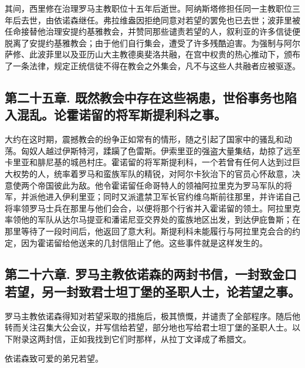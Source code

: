 其间，西里修在治理罗马主教职位十五年后逝世。阿纳斯塔修担任同一主教职位三年后去世，由依诺森继任。弗拉维盎因拒绝同意对若望的罢免也已去世；波菲里被任命接替他治理安提约基雅教会，并赞同那些谴责若望的人，叙利亚的许多信徒便脱离了安提约基雅教会；由于他们自行集会，遭受了许多残酷迫害。为强制与阿尔萨修、此波菲里以及亚历山大主教德奥斐洛共融，在宫中权贵的热心推动下，颁布了一条法律，规定正统信徒不得在教会之外集会，凡不与这些人共融者应被驱逐。\par


\subsection{第二十五章. 既然教会中存在这些祸患，世俗事务也陷入混乱。论霍诺留的将军斯提利科之事。}

大约在这时期，震撼教会的纷争正如常有的情形，随之引起了国家中的骚乱和动荡。匈奴人越过伊斯特河，蹂躏了色雷斯。伊索里亚的强盗大量集结，劫掠了远至卡里亚和腓尼基的城邑村庄。霍诺留的将军斯提利科，一个若曾有任何人达到过巨大权势的人，统率着罗马和蛮族军队的精锐，对阿尔卡狄治下的官员心怀敌意，决意使两个帝国彼此为敌。他令霍诺留任命哥特人的领袖阿拉里克为罗马军队的将军，并派他进入伊利里亚；同时又派遣禁卫军长官约维乌斯前往那里，并许诺自己将率领罗马士兵在那里与他们会合，以便将那个行省并入霍诺留的领土。阿拉里克率领他的军队从达尔马提亚和潘诺尼亚交界处的蛮族地区出发，到达伊庇鲁斯；在那里等待了一段时间后，他返回了意大利。斯提利科未能履行与阿拉里克会合的约定，因为霍诺留给他送来的几封信阻止了他。这些事件就是这样发生的。\par


\subsection{第二十六章. 罗马主教依诺森的两封书信，一封致金口若望，另一封致君士坦丁堡的圣职人士，论若望之事。}

罗马主教依诺森得知对若望采取的措施后，极其愤慨，并谴责了全部程序。随后他转而关注召集大公会议，并写信给若望，部分地也写给君士坦丁堡的圣职人士。以下附录这两封信，正如我找到它们时那样，从拉丁文译成了希腊文。\par

依诺森致可爱的弟兄若望。\par

